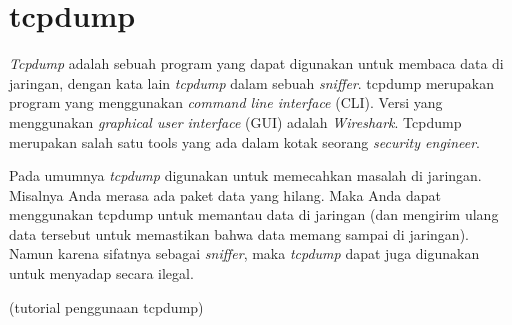 \chapter{tcpdump}
{\em Tcpdump} adalah sebuah program yang dapat digunakan untuk membaca data di
jaringan, dengan kata lain {\em tcpdump} dalam sebuah {\em sniffer}.  tcpdump
merupakan program yang menggunakan {\em command line interface} (CLI). Versi
yang menggunakan {\em graphical user interface} (GUI) adalah {\em Wireshark}.
Tcpdump merupakan salah satu tools yang ada dalam kotak seorang {\em security
engineer}.

Pada umumnya {\em tcpdump} digunakan untuk memecahkan masalah di jaringan.
Misalnya Anda merasa ada paket data yang hilang. Maka Anda dapat menggunakan
tcpdump untuk memantau data di jaringan (dan mengirim ulang data tersebut untuk
memastikan bahwa data memang sampai di jaringan). Namun karena sifatnya sebagai
{\em sniffer}, maka {\em tcpdump} dapat juga digunakan untuk menyadap secara
ilegal.

(tutorial penggunaan tcpdump)
